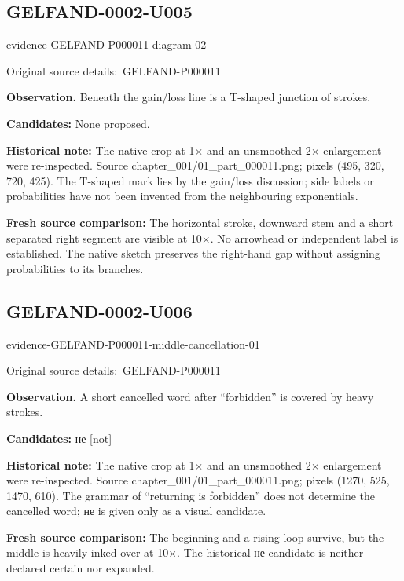 \documentclass[11pt]{article}
\newcommand{\EvidenceBlock}[4]{%
 \par\smallskip\noindent\begin{minipage}{\linewidth}
 \begin{minipage}[t]{.47\linewidth}\vspace{0pt}\centering
 \csname evidence-#1-#2\endcsname\par
 {\scriptsize\SourceCropCaption\ #1}\par
 \end{minipage}\hfill
 \begin{minipage}[t]{.49\linewidth}\vspace{0pt}\raggedright
 {\small\color{orange!65!black}\textbf{#4} #3}\par
 \end{minipage}
 \end{minipage}\par\smallskip}
\newcommand{\SourceCropCaption}{Original source details:}\newcommand{\ReadingCaption}{Uncertain reading.}\newcommand{\IncompleteCaption}{Undeciphered passage.}\newcommand{\DiagramCaption}{Diagram and typed description.}
\begin{document}
\subsection*{GELFAND-0002-U005}
\EvidenceBlock{GELFAND-P000011}{diagram-02}{Beneath the gain/loss line is a T-shaped junction of strokes.}{Observation.}
\par\smallskip\noindent\textbf{Candidates: } None proposed.\par
\par\smallskip\noindent\textbf{Historical note: } The native crop at 1× and an unsmoothed 2× enlargement were re-inspected. Source chapter\_001/01\_part\_000011.png; pixels (495, 320, 720, 425). The T-shaped mark lies by the gain/loss discussion; side labels or probabilities have not been invented from the neighbouring exponentials.\par
\par\smallskip\noindent\textbf{Fresh source comparison: } The horizontal stroke, downward stem and a short separated right segment are visible at 10×. No arrowhead or independent label is established. The native sketch preserves the right-hand gap without assigning probabilities to its branches.\par

\subsection*{GELFAND-0002-U006}
\EvidenceBlock{GELFAND-P000011}{middle-cancellation-01}{A short cancelled word after “forbidden” is covered by heavy strokes.}{Observation.}
\par\smallskip\noindent\textbf{Candidates: } не [not]\par
\par\smallskip\noindent\textbf{Historical note: } The native crop at 1× and an unsmoothed 2× enlargement were re-inspected. Source chapter\_001/01\_part\_000011.png; pixels (1270, 525, 1470, 610). The grammar of “returning is forbidden” does not determine the cancelled word; не is given only as a visual candidate.\par
\par\smallskip\noindent\textbf{Fresh source comparison: } The beginning and a rising loop survive, but the middle is heavily inked over at 10×. The historical не candidate is neither declared certain nor expanded.\par
\end{document}
